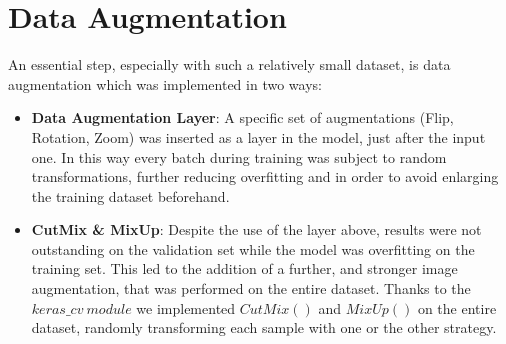 \section{Data Augmentation}
An essential step, especially with such a relatively small dataset, is data augmentation which was implemented in two ways:
\begin{itemize}
    \item {\textbf{Data Augmentation Layer}: A specific set of augmentations (Flip, Rotation, Zoom) was inserted as a layer in the model, just after the input one. In this way every batch during training was subject to random transformations, further reducing overfitting and in order to avoid enlarging the training dataset beforehand.}
    \item {\textbf{CutMix \& MixUp}: Despite the use of the layer above, results were not outstanding on the validation set while the model was overfitting on the training set. This led to the addition of a further, and stronger image augmentation, that was performed on the entire dataset. Thanks to the $keras\_cv\ module$ we implemented $CutMix()$ \cite{cutmix} and $MixUp()$ \cite{mixup} on the entire dataset, randomly transforming each sample with one or the other strategy.} 
\end{itemize}